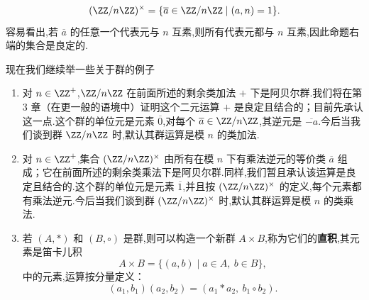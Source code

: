 \begin{proposition}
	\[
(\ZZ/n\ZZ)^\times=\{\overline{a}\in\ZZ/n\ZZ\mid (a,n)=1\}.
\]
容易看出,若 $\overline{a}$ 的任意一个代表元与 $n$ 互素,则所有代表元都与 $n$ 互素,因此命题右端的集合是良定的.

\end{proposition}

现在我们继续举一些关于群的例子
\begin{enumerate}[label=(\arabic*),start=3]
	\item 对 $n\in\ZZ^+$,$\ZZ/n\ZZ$ 在前面所述的剩余类加法 $+$ 下是阿贝尔群.我们将在第 3 章（在更一般的语境中）证明这个二元运算 $+$ 是良定且结合的；目前先承认这一点.这个群的单位元是元素 $\overline{0}$,对每个 $\overline{a}\in\ZZ/n\ZZ$,其逆元是 $\overline{-a}$.今后当我们谈到群 $\ZZ/n\ZZ$ 时,默认其群运算是模 $n$ 的类加法.
	\item 对 $n\in\ZZ^+$,集合 $(\ZZ/n\ZZ)^\times$ 由所有在模 $n$ 下有乘法逆元的等价类 $\overline{a}$ 组成；它在前面所述的剩余类乘法下是阿贝尔群.同样,我们暂且承认该运算是良定且结合的.这个群的单位元是元素 $\overline{1}$,并且按 $(\ZZ/n\ZZ)^\times$ 的定义,每个元素都有乘法逆元.今后当我们谈到群 $(\ZZ/n\ZZ)^\times$ 时,默认其群运算是模 $n$ 的类乘法.
	\item 若 $(A,*)$ 和 $(B,\circ)$ 是群,则可以构造一个新群 $A\times B$,称为它们的\textbf{直积},其元素是笛卡儿积
	\[
	A\times B=\{(a,b)\mid a\in A,\ b\in B\},
	\]
	中的元素,运算按分量定义：
	\[
	(a_1,b_1)(a_2,b_2)=(a_1*a_2,\ b_1\circ b_2).
	\]
\end{enumerate}

